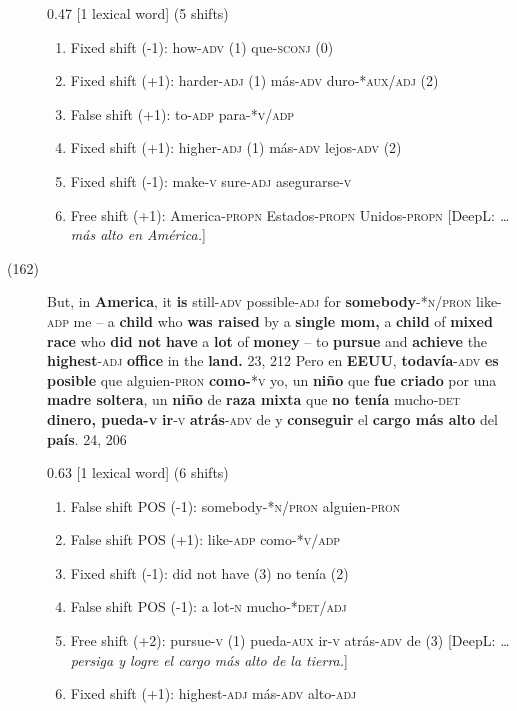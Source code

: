 \documentclass[output=paper]{langsci/langscibook}
\begin{document}
\begin{description}
    0.47 [1 lexical word] (5 shifts)

    \begin{enumerate}
      \item Fixed shift (-1): how\textsc{-adv (1)} \rightarrow que\textsc{-sconj (0)}
      \item Fixed shift (+1): harder\textsc{-adj} (1) \rightarrow más\textsc{-adv} duro\textsc{-*aux/adj} (2)
      \item False shift (+1): to\textsc{-adp} \rightarrow para\textsc{-*v/adp}
      \item Fixed shift (+1): higher\textsc{-adj} (1) \rightarrow más\textsc{-adv} lejos\textsc{-adv} (2)
      \item Fixed shift (-1): make\textsc{-v} sure\textsc{-adj} \rightarrow asegurarse\textsc{-v}
      \item Free shift (+1): America\textsc{-propn} \rightarrow Estados\textsc{-propn} Unidos\textsc{-propn} [DeepL: \textit{\dots más alto en América.}]
    \end{enumerate}

  \item[(162)] But, in \textbf{America}, it \textbf{is} still\textsc{-adv} possible\textsc{-adj} for \textbf{somebody}-*\textsc{n/pron} like\textsc{-adp} me -- a \textbf{child} who \textbf{was raised} by a \textbf{single mom,} a \textbf{child} of \textbf{mixed race} who \textbf{did not} \textbf{have} a \textbf{lot} of \textbf{money} -- to \textbf{pursue} and \textbf{achieve} the \textbf{highest}\textsc{-adj} \textbf{office} in the \textbf{land.} 23, 212 \rightarrow Pero en \textbf{EEUU}, \textbf{todavía}\textsc{-adv} \textbf{es posible} que alguien\textsc{-pron} \textbf{como}\textbf{\textsc{-}}\textsc{*v} yo, un \textbf{niño} que \textbf{fue criado} por una \textbf{madre soltera}, un \textbf{niño} de \textbf{raza mixta} que \textbf{no tenía} mucho\textsc{-det} \textbf{dinero, pueda}\textbf{\textsc{-v}} \textbf{ir}\textsc{-v} \textbf{atrás}\textsc{-adv} de y \textbf{conseguir} el \textbf{cargo más alto} del \textbf{país}. 24, 206

    0.63 [1 lexical word] (6 shifts)

    \begin{enumerate}
      \item False shift POS (-1): somebody-*\textsc{n/pron} \rightarrow alguien-\textsc{pron}
      \item False shift POS (+1): like-\textsc{adp} \rightarrow como-*\textsc{v/adp}
      \item Fixed shift (-1): did not have (3) \rightarrow no tenía (2)
      \item False shift POS (-1): a lot-\textsc{n} \rightarrow mucho\textsc{-*det/adj}
      \item Free shift (+2): pursue-\textsc{v (1)} \rightarrow pueda-\textsc{aux} ir-\textsc{v} atrás\textsc{-adv} de (3) [DeepL: \textit{\dots persiga y logre el cargo más alto de la tierra.}]
      \item Fixed shift (+1): highest\textsc{-adj} \rightarrow más\textsc{-adv} alto\textsc{-adj}
    \end{enumerate}


\end{description}
\end{document}

